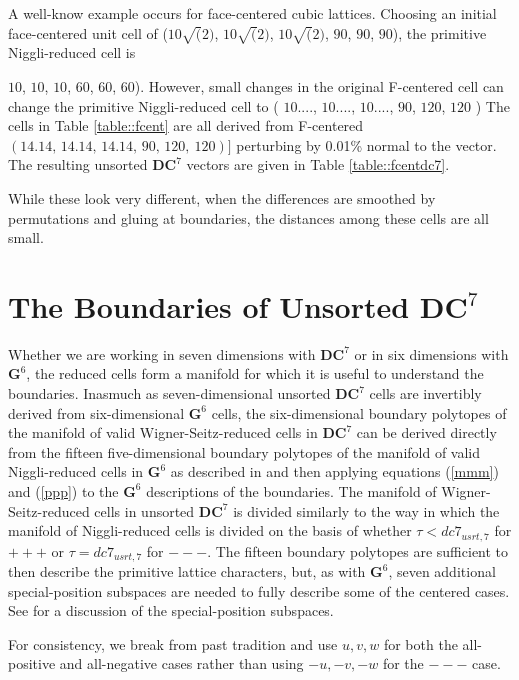 \documentclass[preprint]{iucr}              %
\begin{document}
A well-know example occurs for face-centered cubic lattices. Choosing an initial face-centered unit cell of ($10 \sqrt(2)$, $10 \sqrt(2)$, $10 \sqrt(2)$, $90$, $90$, $90$), the primitive Niggli-reduced cell is {$10$, $10$, $10$, $60$, $60$, $60$). However, small changes in the original F-centered cell can change the 
primitive Niggli-reduced cell to ( $10....$, $10....$, $10....$, $90$, $120$, $120$ )
The cells  in Table \ref{table::fcent} are all derived from F-centered 
$ ( 14.14,\, 14.14,\, 14.14,\, 90,\, 120,\ 120 ) ] $ perturbing 
by 0.01\% normal to the vector.  The resulting unsorted $\mathbf{DC}^7$ vectors are given in Table \ref{table::fcentdc7}. 


While these look very different, when the differences are smoothed
by permutations and gluing at boundaries, the distances among these cells are all small.



\section{The Boundaries of Unsorted $\mathbf{DC}^7$}

Whether we are working in seven dimensions with $\mathbf{DC}^7$ 
or in six dimensions with $\mathbf{G}^6$, the reduced cells
form a manifold for which it is useful to understand the
boundaries.   Inasmuch as seven-dimensional unsorted $\mathbf{DC}^7$ 
cells are invertibly derived from six-dimensional $\mathbf{G}^6$
cells, the six-dimensional boundary polytopes
of the manifold of valid Wigner-Seitz-reduced cells in $\mathbf{DC}^7$ can be derived directly
from the fifteen five-dimensional boundary polytopes of the manifold of valid Niggli-reduced
cells in $\mathbf{G}^6$ as described in \cite{Andrews2014} and then
applying equations (\ref{mmm}) and (\ref{ppp}) to the $\mathbf{G}^6$
descriptions of the boundaries.   The manifold
 of Wigner-Seitz-reduced cells in unsorted $\mathbf{DC}^7$
 is divided similarly to the way in which the manifold of Niggli-reduced cells is
 divided on the basis of whether $\tau < dc7_{usrt,7}$ for $+++$  or $\tau = dc7_{usrt,7}$
 for $---$.  The fifteen boundary polytopes are sufficient to then
 describe the primitive lattice characters, but, as with $\mathbf{G}^6$,
 seven additional special-position subspaces are needed to fully
 describe some of the centered cases.  See \cite{Andrews2014} for a
 discussion of the special-position subspaces.
 
 For consistency, we break from past tradition and use $u,v,w$ for
 both the all-positive and all-negative cases rather than using $-u,-v,-w$ for the
 $---$ case.
 
}
\end{document}
